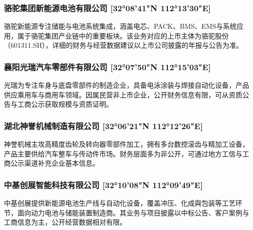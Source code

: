 \subsubsection*{骆驼集团新能源电池有限公司 [32°08'41"N 112°13'30"E]}
骆驼新能源专注储能与电池系统集成，涵盖电芯、PACK、BMS、EMS与系统应用，属于骆驼集团产业链中的重要板块。该业务对应的上市主体为骆驼股份（601311.SH），详细的财务与经营数据建议以上市公司披露的年报与公告为准。

\subsubsection*{襄阳光瑞汽车零部件有限公司 [32°07'50"N 112°15'03"E]}
光瑞为专注车身与底盘零部件的制造企业，具备电泳涂装与焊接自动化设备，产品供应乘用车与商用车领域。因属民营非上市企业，公开财务信息有限，可从资质公告与工商公示获取规模与资质证明。

\subsubsection*{湖北神誉机械制造有限公司 [32°06'21"N 112°12'26"E]}
神誉机械主攻高精度齿轮及转向器零部件加工，拥有多台数控滚齿与精加工设备，产品主要供给汽车整车与传动件市场。财务层面多为非公开，可通过地方工信与工商公示渠道补充企业基本信息。

\subsubsection*{中基创展智能科技有限公司 [32°10'08"N 112°09'49"E]}
中基创展提供新能源电池生产线与自动化设备，覆盖冲压、化成與包装等工艺环节，面向动力电池与储能装置制造商。其业务与项目披露以中标公告、客户案例与工商信息为主，公开经营数据相对有限。


